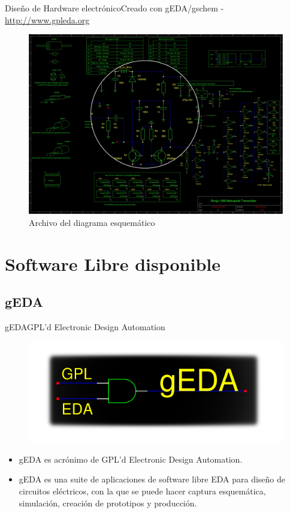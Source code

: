 \documentclass{beamer}
\begin{document}
\begin{frame}{Diseño de Hardware electrónico}{Creado con \alert{gEDA/gschem} - \url{http://www.gpleda.org}}
  \begin{figure}
    \includegraphics[scale=0.21]{transmisor/transmisor_esquema}
    \caption{Archivo del diagrama esquemático}
  \end{figure}
\end{frame}

\section{Software Libre disponible}

\subsection[gEDA - \url{http://www.gpleda.org}]{gEDA}


\begin{frame}{gEDA}{GPL'd Electronic Design Automation}
  \begin{figure}[!h]
    \centering
    \includegraphics[scale=0.4]{img/geda.png}
  \end{figure}
  \begin{itemize}
  \item gEDA es acrónimo de GPL'd Electronic Design Automation.
  \item gEDA es una suite de aplicaciones de software libre EDA para diseño de circuitos eléctricos, con la que se puede hacer captura esquemática, simulación, creación de prototipos y producción.
  \end{itemize}
\end{frame}
\end{document}
